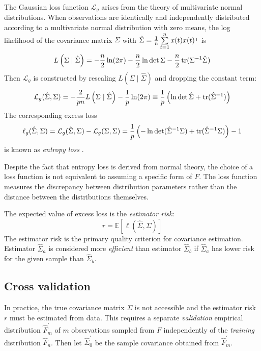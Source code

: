 The Gaussian loss function $\mathcal L_g$  arises from the theory of multivariate normal distributions. When observations are identically and independently distributed according to a multivariate normal distribution with zero means, the log likelihood of the covariance matrix $\Sigma$ with $\hat\Sigma = \frac 1 n \sum\limits_{t=1}^n x(t) x(t)^\intercal$ is  
\begin{equation}
L\left(\Sigma \mid \hat\Sigma\right) = -\frac n 2 \ln(2\pi) - \frac n 2 \ln \det \Sigma - \frac n 2 \operatorname{tr}(\Sigma^{-1} \hat \Sigma)
\end{equation}
Then $\mathcal L_g$ is constructed by rescaling $L\left(\Sigma \mid \hat\Sigma\right)$ and dropping the constant term:
\begin{equation}\label{eq:GaussLoss}
\mathcal L_g(\hat\Sigma,\Sigma) 
=  -\frac 2 {pn} L\left(\Sigma \mid \hat\Sigma \right) - \frac 1 p \ln(2\pi) 
\equiv  \frac 1 p\left(\ln \det \hat \Sigma + \operatorname{tr}(\hat \Sigma^{-1}) \right) 
\end{equation}
The corresponding excess loss 
\begin{equation}
\ell_g(\hat\Sigma,\Sigma) = \mathcal L_g(\hat\Sigma,\Sigma) - \mathcal L_g(\Sigma,\Sigma)  
= \frac 1 p \left(-\ln \det (\hat \Sigma^{-1} \Sigma) + \operatorname{tr}(\hat \Sigma^{-1}\Sigma)\right) - 1
\end{equation}
is known as \emph{entropy loss} \citep{James:1961}. 

Despite the fact that entropy loss is derived from normal theory, the choice of a loss function is not equivalent to assuming a specific form of $F$. The loss function measures the discrepancy between distribution parameters rather than the distance between the distributions themselves.  

The expected value of excess loss is the \emph{estimator risk}:
\begin{equation}\label{eq:risk}
r = \mathbb E\left[\ell(\hat\Sigma,\Sigma)\right]
\end{equation}
The estimator risk is the primary quality criterion for covariance estimation. Estimator $\hat\Sigma_a$ is considered more \emph{efficient} than estimator $\hat\Sigma_b$ if $\hat\Sigma_a$ has lower risk for the given sample than $\hat\Sigma_b$.   

\subsection{Cross validation}
In practice, the true covariance matrix $\Sigma$ is not accessible and the estimator risk $r$ must be estimated from data. This requires a separate \emph{validation} empirical distribution $\hat F_m^\prime$ of $m$ observations sampled from $F$ independently of the \emph{training} distribution $\hat F_n$. 
Then let  $\hat \Sigma_0^\prime$ be the sample covariance obtained from $\hat F_m^\prime$. 

